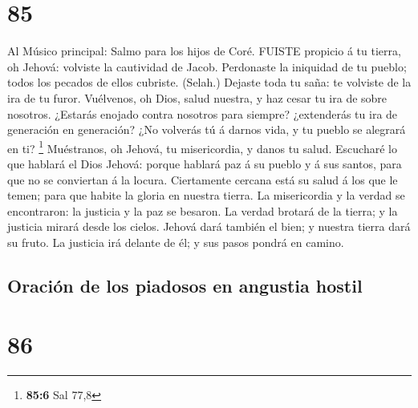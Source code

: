 \hypertarget{section-84}{%
\section{85}\label{section-84}}

 Al Músico principal: Salmo para los hijos de Coré. FUISTE
propicio á tu tierra, oh Jehová: volviste la cautividad de Jacob.
 Perdonaste la iniquidad de tu pueblo; todos los pecados de
ellos cubriste. (Selah.)  Dejaste toda tu saña: te volviste
de la ira de tu furor.  Vuélvenos, oh Dios, salud nuestra, y
haz cesar tu ira de sobre nosotros.  ¿Estarás enojado contra
nosotros para siempre? ¿extenderás tu ira de generación en generación?
 ¿No volverás tú á darnos vida, y tu pueblo se alegrará en
ti? \footnote{\textbf{85:6} Sal 77,8}  Muéstranos, oh
Jehová, tu misericordia, y danos tu salud.  Escucharé lo que
hablará el Dios Jehová: porque hablará paz á su pueblo y á sus santos,
para que no se conviertan á la locura.  Ciertamente cercana
está su salud á los que le temen; para que habite la gloria en nuestra
tierra.  La misericordia y la verdad se encontraron: la
justicia y la paz se besaron.  La verdad brotará de la
tierra; y la justicia mirará desde los cielos.  Jehová dará
también el bien; y nuestra tierra dará su fruto.  La
justicia irá delante de él; y sus pasos pondrá en camino.

\hypertarget{oraciuxf3n-de-los-piadosos-en-angustia-hostil}{%
\subsection{Oración de los piadosos en angustia
hostil}\label{oraciuxf3n-de-los-piadosos-en-angustia-hostil}}

\hypertarget{section-85}{%
\section{86}\label{section-85}}

